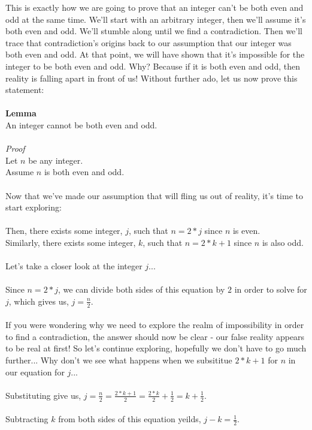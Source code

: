 \documentclass[a4paper,12pt]{article}
\begin{document}
This is exactly how we are going to prove that an integer can't be both even and odd at the same time. We'll start with an arbitrary integer, then we'll assume it's both even and odd. We'll stumble along until we find a contradiction. Then we'll trace that contradiction's origins back to our assumption that our integer was both even and odd. At that point, we will have shown that it's impossible for the integer to be both even and odd. Why? Because if it is both even and odd, then reality is falling apart in front of us! Without further ado, let us now prove this statement:\\
\\
\textbf{Lemma}\\
An integer cannot be both even and odd.\\
\\
\textit{Proof}\\
Let $n$ be any integer.\\
Assume $n$ is both even and odd.\\
\\
Now that we've made our assumption that will fling us out of reality, it's time to start exploring:\\
\\
Then, there exists some integer, $j$, such that $n = 2*j$ since $n$ is even.\\
Similarly, there exists some integer, $k$, such that $n = 2*k + 1$ since $n$ is also odd.\\
\\
Let's take a closer look at the integer $j$...\\
\\
Since $n = 2*j$, we can divide both sides of this equation by $2$ in order to solve for $j$, which gives us, $j = \frac{n}{2}$.\\
\\
If you were wondering why we need to explore the realm of impossibility in order to find a contradiction, the answer should now be clear - our false reality appears to be real at first! So let's continue exploring, hopefully we don't have to go much further... Why don't we see what happens when we subsititue $2*k + 1$ for $n$ in our equation for $j$...\\
\\
Substituting give us, $j = \frac{n}{2} = \frac{2*k + 1}{2} = \frac{2*k}{2} + \frac{1}{2} = k + \frac{1}{2}$.\\
\\ 
Subtracting $k$ from both sides of this equation yeilds, $j - k = \frac{1}{2}$.\\
\end{document}
